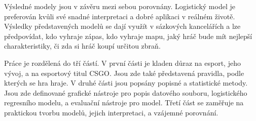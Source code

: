 Výsledné modely jsou v závěru mezi sebou porovnány. Logistický model je preferován kvůli své snadné interpretaci a 
dobré aplikaci v reálném životě. Výsledky představených modelů se dají využít v sázkových kancelářích
a lze předpovídat, kdo vyhraje zápas, kdo vyhraje mapu, jaký hráč bude mít nejlepší charakteristiky, či zda si hráč koupí určitou zbraň.

Práce je rozdělená do tří částí. V první části je kladen důraz na esport, jeho vývoj, a na esportový titul \ac{CSGO}. Jsou zde také představená pravidla, podle kterých se
hra hraje. V druhé části jsou popsány popisné a statistické metody. Jsou zde definované grafické nástroje pro popis datového souboru, logistického
regresního modelu, a evaluační nástroje pro model. Třetí část se zaměřuje na praktickou tvorbu modelů, jejich interpretaci, a vzájemné porovnání.
